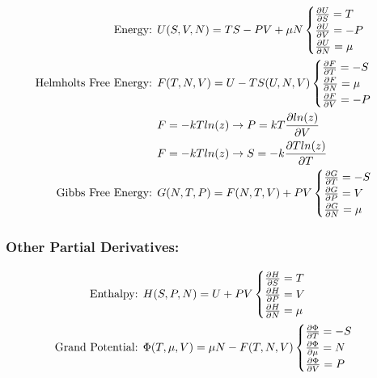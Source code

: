 \begin{align}
	\text{Energy: }                & U(S, V, N) = TS - PV + \mu N
	\begin{cases}
		\pdv{U}{S} = T   \\
		\pdv{U}{V} = -P  \\
		\pdv{U}{N} = \mu \\
	\end{cases}                                                                     \\
	\text{Helmholts Free Energy: } & F(T, N, V) = U - T S(U, N, V)
	\begin{cases}
		\pdv{F}{T} = -S  \\
		\pdv{F}{N} = \mu \\
		\pdv{F}{V} = -P  \\
	\end{cases}                                                                     \\
	                               & F = -k T ln(z) \rightarrow P = k T \pdv{ln(z)}{V}   \\
	                               & F = -k T ln(z) \rightarrow S = - k \pdv{T ln(z)}{T} \\
	\text{Gibbs Free Energy: }     & G(N, T, P) = F(N, T, V) + PV
	\begin{cases}
		\pdv{G}{T} = -S  \\
		\pdv{G}{P} = V   \\
		\pdv{G}{N} = \mu \\
	\end{cases}                                                                     \\
\end{align}

\subsubsection*{Other Partial Derivatives:}

\begin{align}
	\text{Enthalpy: }        & H(S, P, N) = U + PV
	\begin{cases}
		\pdv{H}{S} = T   \\
		\pdv{H}{P} = V   \\
		\pdv{H}{N} = \mu \\
	\end{cases}                                                \\
	\text{Grand Potential: } & \Phi(T, \mu, V) = \mu N - F(T, N, V)
	\begin{cases}
		\pdv{\Phi}{T} = -S   \\
		\pdv{\Phi}{\mu} = N \\
		\pdv{\Phi}{V} = P   \\
	\end{cases}
\end{align}

